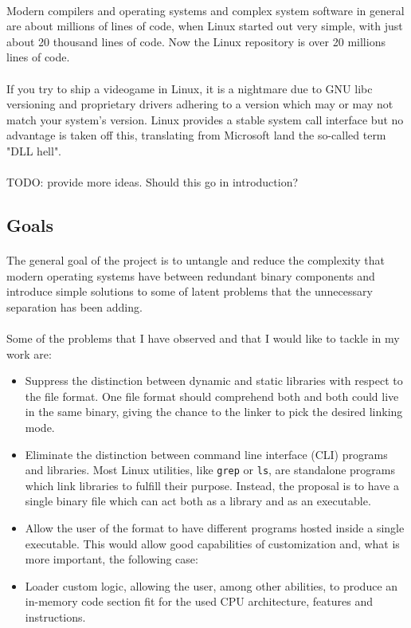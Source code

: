 \documentclass[12pt]{article}
\begin{document}
	\paragraph{} Modern compilers and operating systems and complex system software in general are about millions of lines of code, when Linux started out very simple, with just about 20 thousand lines of code. Now the Linux repository is over 20 millions lines of code.
	\paragraph{} If you try to ship a videogame in Linux, it is a nightmare due to GNU libc versioning and proprietary drivers adhering to a version which may or may not match your system's version. Linux provides a stable system call interface but no advantage is taken off this, translating from Microsoft land the so-called term "DLL hell".
	\paragraph{}TODO: provide more ideas. Should this go in introduction?
	\subsection{Goals}
	\paragraph{}The general goal of the project is to untangle and reduce the complexity that modern operating systems have between redundant binary components and introduce simple solutions to some of latent problems that the unnecessary separation has been adding.	
	\paragraph{}Some of the problems that I have observed and that I would like to tackle in my work are:
	\begin{itemize}
		\item Suppress the distinction between dynamic and static libraries with respect to the file format. One file format should comprehend both and both could live in the same binary, giving the chance to the linker to pick the desired linking mode.
		\item Eliminate the distinction between command line interface (CLI) programs and libraries. Most Linux utilities, like \verb|grep| or \verb|ls|, are standalone programs which link libraries to fulfill their purpose. Instead, the proposal is to have a single binary file which can act both as a library and as an executable.
		\item Allow the user of the format to have different programs hosted inside a single executable. This would allow good capabilities of customization and, what is more important, the following case:
		\item Loader custom logic, allowing the user, among other abilities, to produce an in-memory code section fit for the used CPU architecture, features and instructions.
	\end{itemize}
\end{document}
